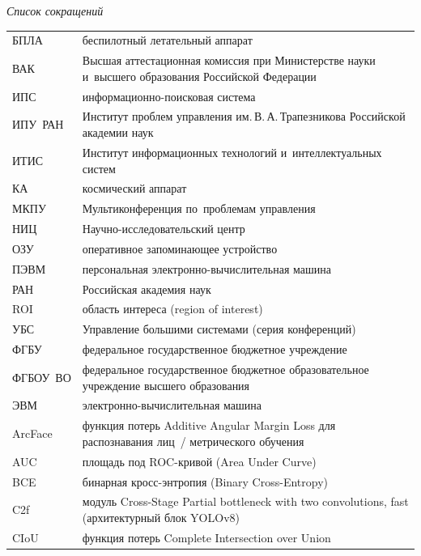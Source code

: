 
\noindent\textit{Список сокращений}

\begin{longtable}{@{}p{}p{}@{}}
БПЛА    & беспилотный летательный аппарат\\
ВАК     & Высшая аттестационная комиссия при Министерстве науки и~высшего образования Российской Федерации\\
ИПС     & информационно-поисковая система\\
ИПУ~РАН & Институт проблем управления им.\,В.\,А.\,Трапезникова Российской академии наук\\
ИТИС    & Институт информационных технологий и~интеллектуальных систем\\
КА      & космический аппарат\\
МКПУ    & Мультиконференция по~проблемам управления\\
НИЦ     & Научно-исследовательский центр\\
ОЗУ     & оперативное запоминающее устройство\\
ПЭВМ    & персональная электронно-вычислительная машина\\
РАН     & Российская академия наук\\
ROI     & область интереса (region of interest)\\
УБС     & Управление большими системами (серия конференций)\\
ФГБУ    & федеральное государственное бюджетное учреждение\\
ФГБОУ~ВО & федеральное государственное бюджетное образовательное учреждение высшего образования\\
ЭВМ     & электронно-вычислительная машина\\
ArcFace & функция потерь Additive Angular Margin Loss для распознавания лиц~/ метрического обучения\\
AUC     & площадь под ROC-кривой (Area Under Curve)\\
BCE     & бинарная кросс-энтропия (Binary Cross-Entropy)\\
C2f     & модуль Cross-Stage Partial bottleneck with two convolutions, fast (архитектурный блок YOLOv8)\\
CIoU    & функция потерь Complete Intersection over Union\\

\end{longtable}
